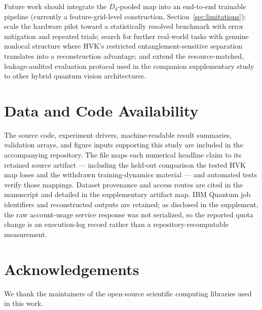 \documentclass[sn-mathphys,Numbered]{sn-jnl}
\begin{document}
Future work should integrate the $D_4$-pooled map into an end-to-end trainable pipeline (currently a feature-grid-level construction, Section~\ref{sec:limitations}); scale the hardware pilot toward a statistically resolved benchmark with error mitigation and repeated trials; search for further real-world tasks with genuine nonlocal structure where HVK's restricted entanglement-sensitive separation translates into a reconstruction advantage; and extend the resource-matched, leakage-audited evaluation protocol used in the companion supplementary study to other hybrid quantum vision architectures.

\section*{Data and Code Availability}
The source code, experiment drivers, machine-readable result summaries, validation arrays, and figure inputs supporting this study are included in the accompanying repository. The file  maps each numerical headline claim to its retained source artifact --- including the held-out comparison the tested HVK map loses and the withdrawn training-dynamics material --- and automated tests verify those mappings. Dataset provenance and access routes are cited in the manuscript and detailed in the supplementary artifact map. IBM Quantum job identifiers and reconstructed outputs are retained; as disclosed in the supplement, the raw account-usage service response was not serialized, so the reported quota change is an execution-log record rather than a repository-recomputable measurement.

\section*{Acknowledgements}
We thank the maintainers of the open-source scientific computing libraries used in this work.
\end{document}
